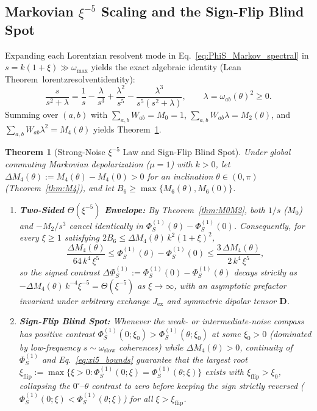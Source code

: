 \documentclass[twocolumn,10pt,amsmath,amssymb,floatfix]{revtex4-2}
\theoremstyle{plain}
\newtheorem{theorem}{Theorem}
\theoremstyle{definition}
\newcommand{\DeltaPhi}{\Delta\Phi_S}
\newcommand{\xiflip}{\xi_{\mathrm{flip}}}
\newcommand{\leanid}[1]{{\footnotesize\ttfamily\def\_{\textunderscore\allowbreak}#1}}
\begin{document}
\subsection{Markovian \texorpdfstring{$\xi^{-5}$}{xi\^{}(-5)} Scaling and the Sign-Flip Blind Spot}

Expanding each Lorentzian resolvent mode in Eq.~\eqref{eq:PhiS_Markov_spectral} in $s = k(1+\xi) \gg \omega_{\max}$ yields the exact algebraic identity (Lean Theorem~\leanid{lorentz\_resolvent\_identity}):
\begin{equation}
\label{eq:lorentz_exp}
\frac{s}{s^2 + \lambda} = \frac{1}{s} - \frac{\lambda}{s^3} + \frac{\lambda^2}{s^5} - \frac{\lambda^3}{s^5(s^2+\lambda)}, \qquad \lambda = \omega_{ab}(\theta)^2 \ge 0.
\end{equation}
Summing over $(a,b)$ with $\sum_{a,b} W_{ab} = M_0 = 1$, $\sum_{a,b} W_{ab}\lambda = M_2(\theta)$, and $\sum_{a,b} W_{ab}\lambda^2 = M_4(\theta)$ yields Theorem~\ref{thm:xi5_blindspot}.

\begin{theorem}[Strong-Noise $\xi^{-5}$ Law and Sign-Flip Blind Spot]
\label{thm:xi5_blindspot}\mbox{}
Under global commuting Markovian depolarization ($\mu=1$) with $k > 0$, let $\Delta M_4(\theta) := M_4(\theta) - M_4(0) > 0$ for an inclination $\theta \in (0,\pi)$ (Theorem~\ref{thm:M4}), and let $B_6 \ge \max\{M_6(\theta), M_6(0)\}$.
\begin{enumerate}[label=(\alph*),leftmargin=1.5em,itemsep=1pt]
\item \textbf{Two-Sided $\Theta(\xi^{-5})$ Envelope:} By Theorem~\ref{thm:M0M2}, both $1/s$ ($M_0$) and $-M_2/s^3$ cancel identically in $\Phi_S^{(1)}(\theta) - \Phi_S^{(1)}(0)$. Consequently, for every $\xi \ge 1$ satisfying $2 B_6 \le \Delta M_4(\theta)\, k^2(1+\xi)^2$,
\begin{equation}
\label{eq:xi5_bounds}
\frac{\Delta M_4(\theta)}{64\,k^4\,\xi^5} \le \Phi_S^{(1)}(\theta) - \Phi_S^{(1)}(0) \le \frac{3\,\Delta M_4(\theta)}{2\,k^4\,\xi^5},
\end{equation}
so the signed contrast $\DeltaPhi^{(1)} := \Phi_S^{(1)}(0) - \Phi_S^{(1)}(\theta)$ decays strictly as $-\Delta M_4(\theta)\, k^{-4}\xi^{-5} = \Theta(\xi^{-5})$ as $\xi \to \infty$, with an asymptotic prefactor invariant under arbitrary exchange $J_{\mathrm{ex}}$ and symmetric dipolar tensor $\mathbf{D}$.
\item \textbf{Sign-Flip Blind Spot:} Whenever the weak- or intermediate-noise compass has positive contrast $\Phi_S^{(1)}(0;\xi_0) > \Phi_S^{(1)}(\theta;\xi_0)$ at some $\xi_0 > 0$ (dominated by low-frequency $s \sim \omega_{\mathrm{slow}}$ coherences) while $\Delta M_4(\theta) > 0$, continuity of $\Phi_S^{(1)}$ and Eq.~\eqref{eq:xi5_bounds} guarantee that the largest root $\xiflip := \max\{\xi > 0 :\allowbreak \Phi_S^{(1)}(0;\xi) = \Phi_S^{(1)}(\theta;\xi)\}$ exists with $\xiflip > \xi_0$, collapsing the $0^\circ\text{--}\theta$ contrast to zero before keeping the sign strictly reversed ($\Phi_S^{(1)}(0;\xi) < \Phi_S^{(1)}(\theta;\xi)$) for all $\xi > \xiflip$.
\end{enumerate}
\end{theorem}
\end{document}
